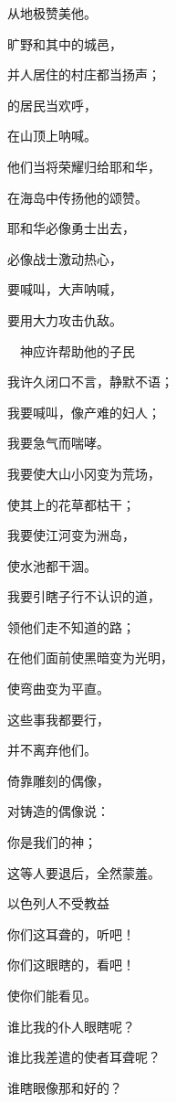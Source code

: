 {\par }{\Q 从地极赞美他。
\par }{\Q {}旷野和其中的城邑，
\par }{\Q 并{}人居住的村庄都当扬声；
\par }{的居民当欢呼，
\par }{\Q 在山顶上呐喊。
\par }{\Q {}他们当将荣耀归给耶和华，
\par }{\Q 在海岛中传扬他的颂赞。
\par }{\Q {}耶和华必像勇士出去，
\par }{\Q 必像战士激动热心，
\par }{\Q 要喊叫，大声呐喊，
\par }{\Q 要用大力攻击仇敌。
\par }{\SH 　神应许帮助他的子民
\par }{\Q {}我许久闭口不言，静默不语；
\par }{我要喊叫，像产难的妇人；
\par }{\Q 我要急气而喘哮。
\par }{\Q {}我要使大山小冈变为荒场，
\par }{\Q 使其上的花草都枯干；
\par }{\Q 我要使江河变为洲岛，
\par }{\Q 使水池都干涸。
\par }{\Q {}我要引瞎子行不认识的道，
\par }{\Q 领他们走不知道的路；
\par }{\Q 在他们面前使黑暗变为光明，
\par }{\Q 使弯曲变为平直。
\par }{\Q 这些事我都要行，
\par }{\Q 并不离弃他们。
\par }{\Q {}倚靠雕刻的偶像，
\par }{\Q 对铸造的偶像说：
\par }{\Q 你是我们的神；
\par }{\Q 这等人要退后，全然蒙羞。
\par }{\SH 以色列人不受教益
\par }{\Q {}你们这耳聋的，听吧！
\par }{\Q 你们这眼瞎的，看吧！
\par }{\Q 使你们能看见。
\par }{\Q {}谁比我的仆人眼瞎呢？
\par }{\Q 谁比我差遣的使者耳聋呢？
\par }{\Q 谁瞎眼像那{}和好的？
}
